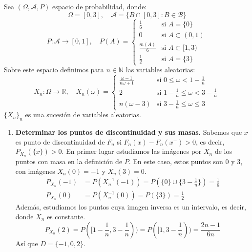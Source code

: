 \begin{exercise}
    Sea $(\Omega, \mathcal{A}, P)$ espacio de probabilidad, donde:
    $$\Omega = [0, 3], \quad \mathcal{A} = \{ B \cap [0, 3] : B \in \mathcal{B} \}$$
    $$P: \mathcal{A} \to [0, 1], \quad P(A) = \begin{cases}
            \frac{1}{6}    & \text{si } A = \{0\}        \\
            0              & \text{si } A \subset (0, 1) \\
            \frac{m(A)}{6} & \text{si } A \subset [1, 3) \\
            \frac{1}{2}    & \text{si } A = \{3\}
        \end{cases}$$
    Sobre este espacio definimos para $n \in \mathbb{N}$ las variables aleatorias:
    $$X_n: \Omega \to \mathbb{R}, \quad X_n(\omega) = \begin{cases}
            \frac{\omega - 1}{n\omega + 1} & \text{si } 0 \leq \omega < 1 - \frac{1}{n}               \\
            2                              & \text{si } 1 - \frac{1}{n} \leq \omega < 3 - \frac{1}{n} \\
            n(\omega - 3)                  & \text{si } 3 - \frac{1}{n} \leq \omega \leq 3
        \end{cases}$$
    $\{X_n\}_n$ es una sucesión de variables aleatorias.

    \begin{enumerate}
        \item \textbf{Determinar los puntos de discontinuidad y sus masas.}
              Sabemos que $x$ es punto de discontinuidad de $F_n$ si $F_n(x) - F_n(x^-) > 0$, es decir, $P_{X_n}(\{x\}) > 0$.
              En primer lugar estudiamos las imágenes por $X_n$ de los puntos con masa en la definición de $P$.
              En este caso, estos puntos son 0 y 3, con imágenes $X_n(0) = -1$ y $X_n(3) = 0$.
              \begin{align*}
                  P_{X_n}(-1) & = P(X_n^{-1}(-1)) = P(\{0\} \cup \{3-\frac{1}{n}\}) = \frac{1}{6} \\
                  P_{X_n}(0)  & = P(X_n^{-1}(0)) = P(\{3\}) = \frac{1}{2}
              \end{align*}
              Además, estudiamos los puntos cuya imagen inversa es un intervalo, es decir, donde $X_n$ es constante.
              $$P_{X_n}(2) = P([1-\frac{1}{n}, 3-\frac{1}{n})) = P([1, 3-\frac{1}{n})) = \frac{2n-1}{6n}$$
              Así que $D = \{-1, 0, 2\}$.


\end{enumerate}
\end{exercise}
